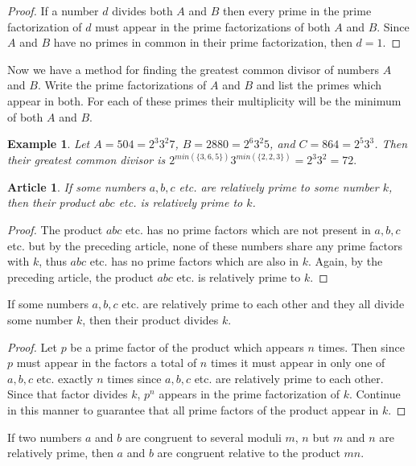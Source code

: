 \documentclass{article}
\theoremstyle{problemstyle}
\newtheorem{example}{Example}
\newtheorem{article}{Article}
\begin{document}
\begin{proof}
If a number $d$ divides both $A$ and $B$ then every prime in the prime factorization of $d$ must appear in the prime factorizations of both $A$ and $B$. Since $A$ and $B$ have no primes in common in their prime factorization, then $d = 1$.
\end{proof}

Now we have a method for finding the greatest common divisor of numbers $A$ and $B$. Write the prime factorizations of $A$ and $B$ and list the primes which appear in both. For each of these primes their multiplicity will be the minimum of both $A$ and $B$. 

\begin{example}
Let $A = 504 = 2^3 3^2 7$, $B = 2880 = 2^6 3^2 5$, and $C = 864 = 2^5 3^3$. Then their greatest common divisor is $2^{min(\{3,6,5\})}3^{min(\{2,2,3\})} = 2^3 3^2 = 72. $
\end{example}

\begin{article}
If some numbers $a,b,c$ etc. are relatively prime to some number $k$, then their product $abc$ etc. is relatively prime to $k$.
\end{article}

\begin{proof}
The product $abc$ etc. has no prime factors which are not present in $a,b,c$ etc. but by the preceding article, none of these numbers share any prime factors with $k$, thus $abc$ etc. has no prime factors which are also in $k$. Again, by the preceding article, the product $abc$ etc. is relatively prime to $k$.
\end{proof}

If some numbers $a,b,c$ etc. are relatively prime to each other and they all divide some number $k$, then their product divides $k$. 

\begin{proof}
Let $p$ be a prime factor of the product which appears $n$ times. Then since $p$ must appear in the factors a total of $n$ times it must appear in only one of $a,b,c$ etc. exactly $n$ times since $a,b,c$ etc. are relatively prime to each other. Since that factor divides $k$, $p^n$ appears in the prime factorization of $k$. Continue in this manner to guarantee that all prime factors of the product appear in $k$. 
\end{proof}

If two numbers $a$ and $b$ are congruent to several moduli $m$, $n$ but $m$ and $n$ are relatively prime, then $a$ and $b$ are congruent relative to the product $mn$. 
\end{document}
